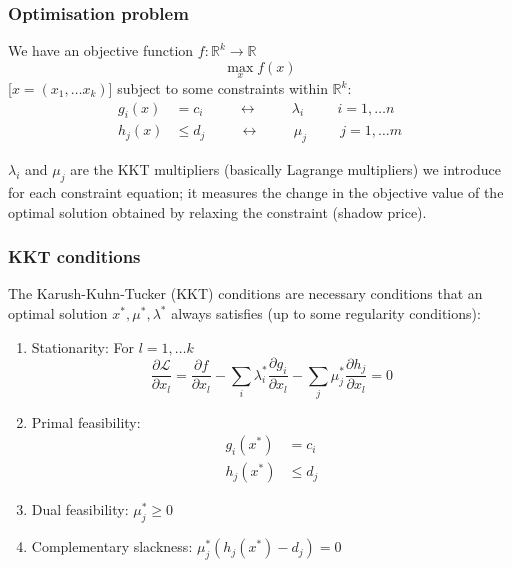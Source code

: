\documentclass[10pt,dvipsnames]{beamer}
\newcommand{\R}{\mathbb{R}}
\def\l{\lambda}
\def\m{\mu}
\def\d{\partial}
\def\cL{\mathcal{L}}
\let\olditem\item
\renewcommand{\item}{%
\olditem\vspace{5pt}}
\begin{document}
\begin{frame}
  \frametitle{Optimisation problem}


We have an \alert{objective function} $f: \R^k \to \R$
\begin{equation*}
  \max_{x} f(x)
\end{equation*}
[$x = (x_1, \dots x_k)$] subject to some \alert{constraints} within $\R^k$:
\begin{align*}
  g_i(x) & = c_i \hspace{1cm}\leftrightarrow\hspace{1cm} \l_i \hspace{1cm} i = 1,\dots n \\
  h_j(x) & \leq d_j \hspace{1cm}\leftrightarrow\hspace{1cm} \m_j \hspace{1cm} j = 1,\dots m
\end{align*}

$\l_i$ and $\m_j$ are the \alert{KKT multipliers} (basically Lagrange multipliers) we introduce for
each constraint equation; it measures the change in the objective value of the optimal solution obtained by relaxing the constraint (shadow price).

\end{frame}



\begin{frame}
  \frametitle{KKT conditions}

The \alert{Karush-Kuhn-Tucker (KKT) conditions} are necessary conditions that an optimal solution $x^*,\m^*,\l^*$ always satisfies (up to some regularity conditions):
\begin{enumerate}
\item \alert{Stationarity}: For $l = 1,\dots k$
  \begin{equation*}
  \frac{\d \cL}{\d x_l} =   \frac{\d f}{\d x_l} - \sum_i \l_i^* \frac{\d g_i}{\d x_l}  - \sum_j \m_j^* \frac{\d h_j}{\d x_l} = 0
  \end{equation*}
    \item \alert{Primal feasibility}:
      \begin{align*}
        g_i(x^*) & = c_i \\
        h_j(x^*) &\leq d_j
      \end{align*}
    \item \alert{Dual feasibility}: $\m_j^* \geq 0$
    \item \alert{Complementary slackness}: $\m_j^* (h_j(x^*) - d_j) = 0$
\end{enumerate}

\end{frame}
\end{document}
